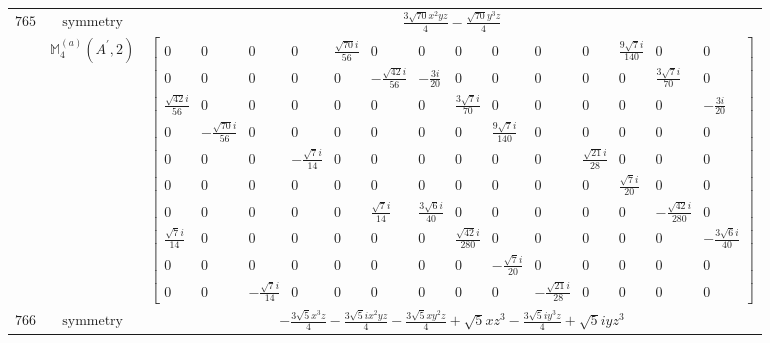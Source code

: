 \documentclass[fleqn,8pt,landscape]{jsarticle}
\begin{document}
\begin{longtable}{ccc}
$ 765 $ & $ \text{symmetry} $ & $ \frac{3 \sqrt{70} x^{2} y z}{4} - \frac{\sqrt{70} y^{3} z}{4} $ \\
$  $ & $ \mathbb{M}_{4}^{(a)}(A^{\prime},2) $ & $ \begin{bmatrix} 0 & 0 & 0 & 0 & \frac{\sqrt{70} i}{56} & 0 & 0 & 0 & 0 & 0 & 0 & \frac{9 \sqrt{7} i}{140} & 0 & 0 \\ 0 & 0 & 0 & 0 & 0 & - \frac{\sqrt{42} i}{56} & - \frac{3 i}{20} & 0 & 0 & 0 & 0 & 0 & \frac{3 \sqrt{7} i}{70} & 0 \\ \frac{\sqrt{42} i}{56} & 0 & 0 & 0 & 0 & 0 & 0 & \frac{3 \sqrt{7} i}{70} & 0 & 0 & 0 & 0 & 0 & - \frac{3 i}{20} \\ 0 & - \frac{\sqrt{70} i}{56} & 0 & 0 & 0 & 0 & 0 & 0 & \frac{9 \sqrt{7} i}{140} & 0 & 0 & 0 & 0 & 0 \\ 0 & 0 & 0 & - \frac{\sqrt{7} i}{14} & 0 & 0 & 0 & 0 & 0 & 0 & \frac{\sqrt{21} i}{28} & 0 & 0 & 0 \\ 0 & 0 & 0 & 0 & 0 & 0 & 0 & 0 & 0 & 0 & 0 & \frac{\sqrt{7} i}{20} & 0 & 0 \\ 0 & 0 & 0 & 0 & 0 & \frac{\sqrt{7} i}{14} & \frac{3 \sqrt{6} i}{40} & 0 & 0 & 0 & 0 & 0 & - \frac{\sqrt{42} i}{280} & 0 \\ \frac{\sqrt{7} i}{14} & 0 & 0 & 0 & 0 & 0 & 0 & \frac{\sqrt{42} i}{280} & 0 & 0 & 0 & 0 & 0 & - \frac{3 \sqrt{6} i}{40} \\ 0 & 0 & 0 & 0 & 0 & 0 & 0 & 0 & - \frac{\sqrt{7} i}{20} & 0 & 0 & 0 & 0 & 0 \\ 0 & 0 & - \frac{\sqrt{7} i}{14} & 0 & 0 & 0 & 0 & 0 & 0 & - \frac{\sqrt{21} i}{28} & 0 & 0 & 0 & 0 \end{bmatrix} $ \\ \hline
$ 766 $ & $ \text{symmetry} $ & $ - \frac{3 \sqrt{5} x^{3} z}{4} - \frac{3 \sqrt{5} i x^{2} y z}{4} - \frac{3 \sqrt{5} x y^{2} z}{4} + \sqrt{5} x z^{3} - \frac{3 \sqrt{5} i y^{3} z}{4} + \sqrt{5} i y z^{3} $ \\

\end{longtable}
\end{document}

